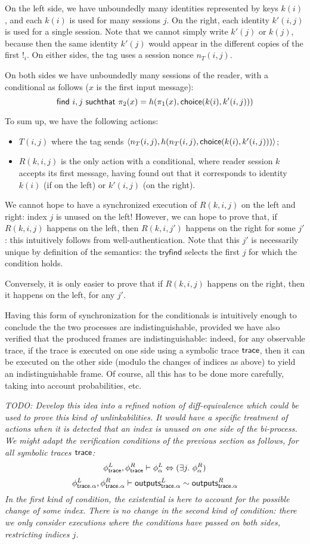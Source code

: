 On the left side, we have unboundedly many
identities represented by keys $k(i)$, and each $k(i)$ is used for
many sessions $j$.
On the right, each identity $k'(i,j)$ is used for a single session.
Note that we cannot simply write $k'(j)$ or $k(j)$, because then the
same identity $k'(j)$ would appear in the different copies of the
first $!_i$.
On either sides, the tag uses a session nonce $n_T(i,j)$.

On both sides we have unboundedly many sessions of the reader,
with a conditional as follows ($x$ is the first input message):
$$\mathsf{find} \ i,j \ \mathsf{suchthat} \ \pi_2(x) =
h(\pi_1(x),\mathsf{choice}(k(i),k'(i,j)))$$

To sum up, we have the following actions:
\begin{itemize}
  \item $T(i,j)$ where the tag sends
    $\langle n_T(i,j),h(n_T(i,j),\mathsf{choice}(k(i),k'(i,j))) \rangle$;
  \item $R(k,i,j)$ is the only action with a conditional,
    where reader session $k$ accepts its first message,
    having found out that it corresponds to identity $k(i)$ (if on
    the left) or $k'(i,j)$ (on the right).
\end{itemize}

We cannot hope to have a synchronized execution of $R(k,i,j)$ on the
left and right: index $j$ is unused on the left!
However, we can hope to prove that, if $R(k,i,j)$ happens on the left,
then $R(k,i,j')$ happens on the right for some $j'$: this intuitively
follows from well-authentication.
Note that this $j'$ is necessarily unique by definition of the semantics:
the $\mathsf{tryfind}$ selects the first $j$ for which the condition holds.

Conversely, it is only easier to prove that if $R(k,i,j)$ happens
on the right, then it happens on the left, for any $j'$.

Having this form of synchronization for the conditionals is intuitively
enough to conclude the the two processes are indistinguishable,
provided we have also verified that the produced frames are indistinguishable:
indeed, for any observable trace, if the trace is executed on one side
using a symbolic trace $\textsf{trace}$, then it can be executed on the other side
(modulo the changes of indices as above) to yield an indistinguishable
frame. Of course, all this has to be done more carefully, taking into
account probabilities, etc.

\emph{TODO: Develop this idea into a refined notion of diff-equivalence
which could be used to prove this kind of unlinkabilities. It would have
a specific treatment of actions when it is detected that an index is unused
on one side of the bi-process. We might adapt the verification conditions
of the previous section as follows, for all symbolic traces $\textsf{trace}$:}
$$ \phi^L_{\textsf{trace}}, \phi^R_{\textsf{trace}} \vdash
   \phi^L_\alpha \Leftrightarrow (\exists j.~ \phi^R_\alpha) $$
$$ \phi^L_{\textsf{trace}.\alpha}, \phi^R_{\textsf{trace}.\alpha} \vdash
   \textsf{outputs}_{\textsf{trace}.\alpha}^L \sim \textsf{outputs}_{\textsf{trace}.\alpha}^R $$
\emph{In the first kind of condition, the existential is here to account
for the possible change of some index. There is no change in the second
kind of condition: there we only consider executions where the conditions
have passed on both sides, restricting indices $j$.}

